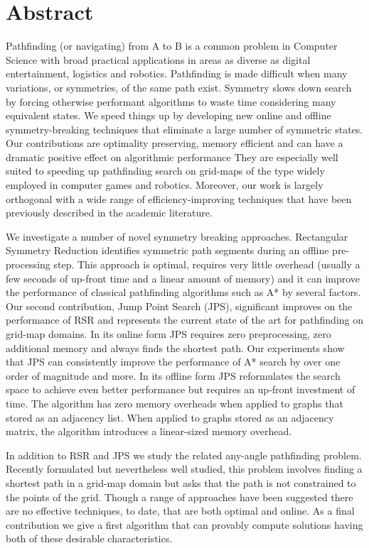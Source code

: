 \chapter*{Abstract}
\vspace{-1em}
Pathfinding (or navigating) from A to B is a common problem in Computer
Science with broad practical applications in areas as diverse as digital
entertainment, logistics and robotics. Pathfinding is made difficult when
many variations, or symmetries, of the same path exist.  Symmetry slows down
search by forcing otherwise performant algorithms to waste time considering
many equivalent states.  We speed things up by developing new online and
offline symmetry-breaking techniques that eliminate a large number of
symmetric states.  Our contributions are optimality preserving, memory
efficient and can have a dramatic positive effect on algorithmic performance 
They are especially well suited to speeding up pathfinding search on grid-maps 
of the type widely employed in computer games and robotics.
Moreover, our work is largely orthogonal with a wide range of
efficiency-improving techniques that have been previously described in the
academic literature.
\par 
We investigate a number of novel symmetry breaking approaches.
Rectangular Symmetry Reduction identifies symmetric path segments during an 
offline pre-processing step.
This approach is optimal, requires very little overhead (usually a few seconds of
up-front time and a linear amount of memory) and it can improve
the performance of classical pathfinding algorithms such as A* by several factors.
Our second contribution, Jump Point
Search (JPS), significant improves on the performance of RSR and
represents the current state of the art for pathfinding on grid-map domains.
In its online form JPS requires zero preprocessing, zero additional memory and
always finds the shortest path. Our experiments show that JPS can consistently
improve the performance of A* search by over one order of magnitude and more.
In its offline form JPS reformulates the search space to achieve even better
performance but requires an up-front investment of time. The algorithm has
zero memory overheads when applied to graphs that stored as an adjacency list.
When applied to graphs stored as an adjacency matrix, the algorithm introduces
a linear-sized memory overhead. 
\par
In addition to RSR and JPS we study the related any-angle pathfinding problem.
Recently formulated but nevertheless well studied, this problem involves finding 
a shortest path in a grid-map domain but asks that the path
is not constrained to the points of the grid.  Though a range of approaches have
been suggested there are no effective techniques, to date, that are both optimal
and online.
As a final contribution we give a first algorithm that can provably compute 
solutions having both of these desirable characteristics.
